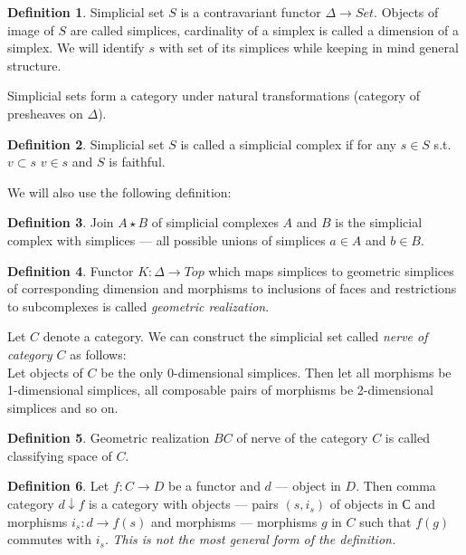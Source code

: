 \documentclass[a4paper, 12pt]{article}
\theoremstyle{definition}
\newtheorem{definition}{Definition}
\theoremstyle{remark}
\newcommand{\define}[1]{{\textit{#1}}}
\begin{document}
\begin{definition}
  Simplicial set $S$ is a contravariant functor $\Delta \to Set$. Objects of image of $S$ are called simplices, cardinality of a simplex is called a dimension of a simplex. We will identify $s$ with set of its simplices while keeping in mind general structure.
\end{definition}

Simplicial sets form a category under natural transformations (category of presheaves on $\Delta$).\\

\begin{definition}
  Simplicial set $S$ is called a simplicial complex if for any $s \in S$ s.t. $v \subset s$  $v \in s$ and $S$ is faithful.
\end{definition}

We will also use the following definition:

\begin{definition}
  Join $A \star B$ of simplicial complexes $A$ and $B$ is the simplicial complex with simplices --- all possible unions of simplices $a \in A$ and $b \in B$.
\end{definition}

\begin{definition}
  Functor $K : \Delta \to Top$ which maps simplices to geometric simplices of corresponding dimension and morphisms to inclusions of faces and restrictions to subcomplexes is called \define{geometric realization}.
\end{definition}

Let $C$ denote a category. We can construct the simplicial set called \define{nerve of category $C$} as follows:\\
Let objects of $C$ be the only 0-dimensional simplices. Then let all morphisms be 1-dimensional simplices, all composable pairs of morphisms be 2-dimensional simplices and so on.

\begin{definition}
  Geometric realization $BC$ of nerve of the category $C$ is called classifying space of $C$.
\end{definition}

\begin{definition}
  Let $f: C \to D$ be a functor and $d$ --- object in $D$. Then comma category $d \downarrow f$ is a category with objects --- pairs $(s,i_s)$ of objects in $С$ and morphisms $i_s : d \to f(s)$ and morphisms --- morphisms $g$ in $C$ such that $f(g)$ commutes with $i_s$. \textit{This is not the most general form of the definition.}
\end{definition}
\end{document}
